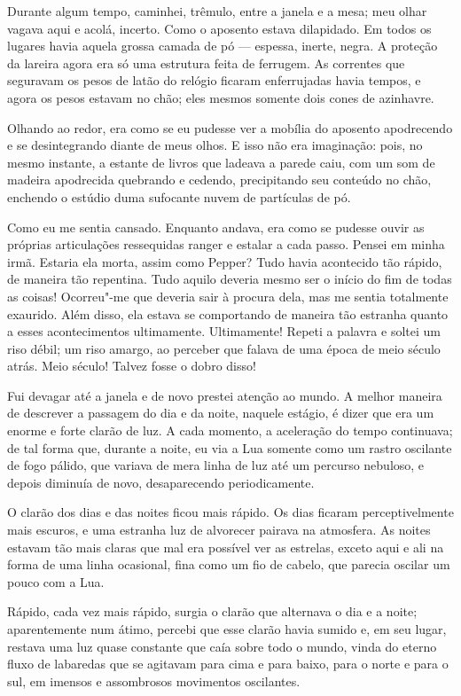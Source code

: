 Durante algum tempo, caminhei, trêmulo, entre a janela e a mesa; meu olhar vagava aqui e acolá, incerto. Como o
aposento estava dilapidado. Em todos os lugares havia aquela grossa camada de pó --- espessa, inerte, negra. A proteção
da lareira agora era só uma estrutura feita de ferrugem. As correntes que seguravam os pesos de latão do relógio
ficaram enferrujadas havia tempos, e agora os pesos estavam no chão; eles mesmos somente dois cones de azinhavre.

Olhando ao redor, era como se eu pudesse ver a mobília do aposento apodrecendo e se desintegrando diante de meus
olhos. E isso não era imaginação: pois, no mesmo instante, a estante de livros que ladeava a parede caiu, com
um som de madeira apodrecida quebrando e cedendo, precipitando seu conteúdo no chão, enchendo o estúdio duma sufocante
nuvem de partículas de pó.

Como eu me sentia cansado. Enquanto andava, era como se pudesse ouvir as próprias articulações ressequidas ranger
e estalar a cada passo. Pensei em minha irmã. Estaria ela morta, assim como Pepper? Tudo havia acontecido tão rápido,
de maneira tão repentina. Tudo aquilo deveria mesmo ser o início do fim de todas as coisas! Ocorreu"-me que deveria sair
à procura dela, mas me sentia totalmente exaurido. Além disso, ela estava se comportando de maneira tão estranha quanto
a esses acontecimentos ultimamente. Ultimamente! Repeti a palavra e soltei um riso débil; um riso amargo, ao perceber
que falava de uma época de meio século atrás. Meio século! Talvez fosse o dobro disso!

Fui devagar até a janela e de novo prestei atenção ao mundo. A melhor maneira de descrever a passagem do dia e da
noite, naquele estágio, é dizer que era um enorme e forte clarão de luz. A cada momento, a aceleração do tempo
continuava; de tal forma que, durante a noite, eu via a Lua somente como um rastro oscilante de fogo pálido, que
variava de mera linha de luz até um percurso nebuloso, e depois diminuía de novo, desaparecendo periodicamente.

O clarão dos dias e das noites ficou mais rápido. Os dias ficaram perceptivelmente mais escuros, e uma estranha luz de
alvorecer pairava na atmosfera. As noites estavam tão mais claras que mal era possível ver as estrelas, exceto aqui e
ali na forma de uma linha ocasional, fina como um fio de cabelo, que parecia oscilar um pouco com a Lua.

Rápido, cada vez mais rápido, surgia o clarão que alternava o dia e a noite; aparentemente num átimo, percebi que
esse clarão havia sumido e, em seu lugar, restava uma luz quase constante que caía sobre todo o mundo, vinda do
eterno fluxo de labaredas que se agitavam para cima e para baixo, para o norte e para o sul, em imensos e assombrosos
movimentos oscilantes.


